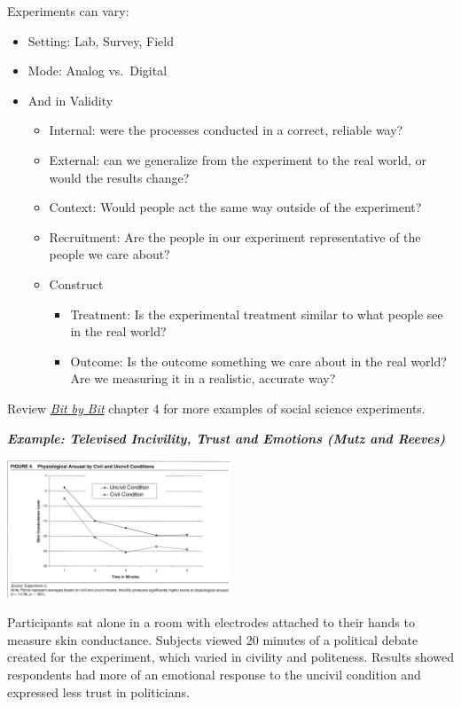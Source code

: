 \documentclass[
  letterpaper,
  DIV=11,
  numbers=noendperiod]{scrreprt}
\providecommand{\tightlist}{%
  \setlength{\itemsep}{0pt}\setlength{\parskip}{0pt}}\usepackage{longtable,booktabs,array}
\begin{document}
Experiments can vary:

\begin{itemize}
\tightlist
\item
  Setting: Lab, Survey, Field
\item
  Mode: Analog vs.~Digital
\item
  And in Validity

  \begin{itemize}
  \tightlist
  \item
    Internal: were the processes conducted in a correct, reliable way?
  \item
    External: can we generalize from the experiment to the real world,
    or would the results change?
  \item
    Context: Would people act the same way outside of the experiment?
  \item
    Recruitment: Are the people in our experiment representative of the
    people we care about?
  \item
    Construct

    \begin{itemize}
    \tightlist
    \item
      Treatment: Is the experimental treatment similar to what people
      see in the real world?
    \item
      Outcome: Is the outcome something we care about in the real world?
      Are we measuring it in a realistic, accurate way?
    \end{itemize}
  \end{itemize}
\end{itemize}

Review
\href{https://www.bitbybitbook.com/en/1st-ed/running-experiments/}{\emph{Bit
by Bit}} chapter 4 for more examples of social science experiments.

\textbf{\emph{Example: Televised Incivility, Trust and Emotions (Mutz
and Reeves)}}

\includegraphics[width=0.5\textwidth,height=\textheight]{images/arousal.png}

Participants sat alone in a room with electrodes attached to their hands
to measure skin conductance. Subjects viewed 20 minutes of a political
debate created for the experiment, which varied in civility and
politeness. Results showed respondents had more of an emotional response
to the uncivil condition and expressed less trust in politicians.
\end{document}
